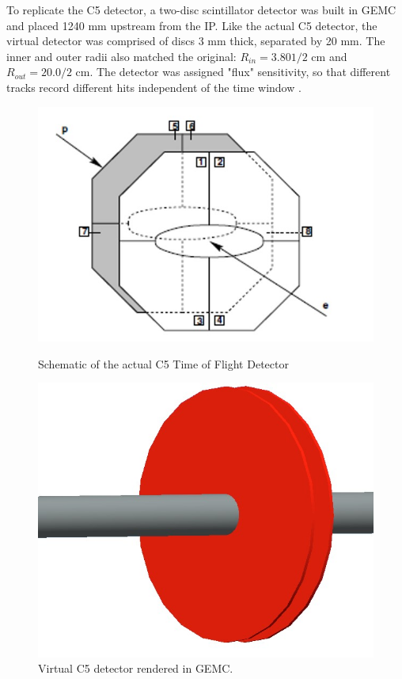To replicate the C5 detector, a two-disc scintillator detector was built in GEMC and placed 1240 mm upstream from the IP.  Like the actual C5 detector, the virtual detector was comprised of discs 3 mm thick, separated by 20 mm.  The inner and outer radii also matched the original: $R_{in} = 3.801/2$ cm and $R_{out} = 20.0/2$ cm.  The detector was assigned "flux" sensitivity, so that different tracks record different hits independent of the time window \cite{ZEUS:1993}.
\begin{figure}[!htb]
	\centering
	\begin{minipage}{0.45\textwidth}
		\centering
		\includegraphics[width=.8\textwidth]{../../img/hera_c5.jpg}
		\caption {Schematic of the actual C5 Time of Flight Detector  }
		\label{fig:hera5}
	\end{minipage}\hfill
	\begin{minipage}{0.45\textwidth}
		\centering	\includegraphics[width=.75\textwidth]{../../img/C5_gemc}	
		\caption {Virtual C5 detector rendered in GEMC.}
		\label{fig:hera6}
	\end{minipage}
\end{figure}

